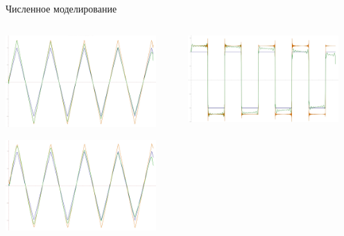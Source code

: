\documentclass[9pt, compress, xcolor=table]{beamer}
\begin{document}
\begin{frame}{Численное моделирование}
\begin{columns}[c]
\column{6.5cm}
\begin{center}
\includegraphics[width=0.9\textwidth]{triangle1.jpg}



\includegraphics[width=0.9\textwidth]{triangle2.jpg}
\end{center}
\column{6.5cm}
\begin{center}
\includegraphics[width=0.9\textwidth]{square1.jpg}
\end{center}


\end{columns}
\end{frame}
\end{document}
